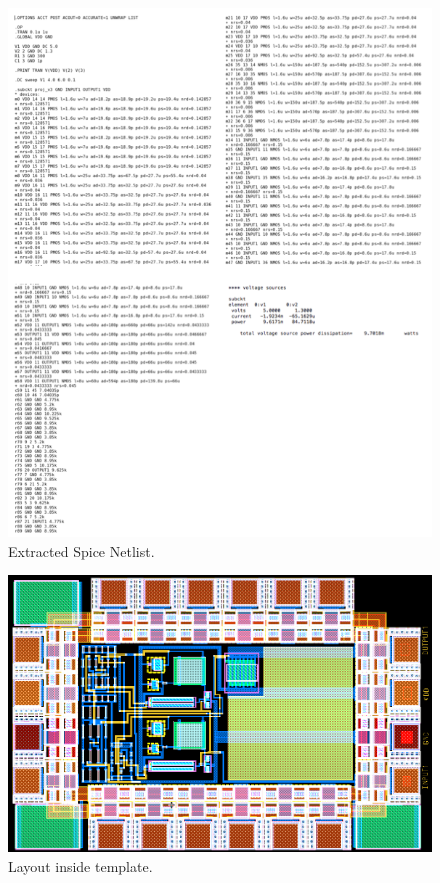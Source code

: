 \documentclass[10pt]{amsart}
\begin{document}
\begin{figure}[H]
	\begin{center}
		\includegraphics[width=7in]{Media/netlist.png}
	\end{center}
	\caption{Extracted Spice Netlist.}
	\label{fig:cc}
\end{figure}

\begin{figure}[H]
	\begin{center}
		\includegraphics[width=9in, angle=270]{Media/full_layout.png}
	\end{center}
	\caption{Layout inside template.}
	\label{fig:cc}
\end{figure}
\end{document}
